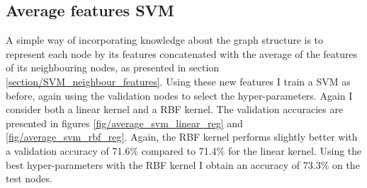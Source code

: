 \documentclass[12pt]{article}
\theoremstyle{definition}
\begin{document}
\subsection{Average features SVM}
A simple way of incorporating knowledge about the graph structure is to represent each node by its features concatenated with the average of the features of its neighbouring nodes, as presented in section \ref{section/SVM_neighbour_features}. Using these new features I train a SVM as before, again using the validation nodes to select the hyper-parameters. Again I consider both a linear kernel and a RBF kernel. The validation accuracies are presented in figures \ref{fig/average_svm_linear_reg} and \ref{fig/average_svm_rbf_reg}. Again, the RBF kernel performs slightly better with a validation accuracy of 71.6\% compared to 71.4\% for the linear kernel. Using the best hyper-parameters with the RBF kernel I obtain an accuracy of 73.3\% on the test nodes.
\end{document}
